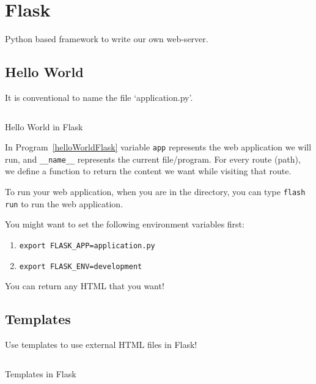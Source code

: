 \chapter{Flask}
Python based framework to write our own web-server.

\section{Hello World}

\begin{remark}
	It is conventional to name the file `application.py'.
\end{remark}

\begin{code}
	\inputminted{python}{codes/web/flask/hello0/application.py}
	\caption{Hello World in Flask}
	\label{helloWorldFlask}
\end{code}

In Program~\ref{helloWorldFlask} variable \texttt{app} represents
the web application we will run, and \texttt{__name__} represents
the current file/program. For every route (path), we define a function to return
the content we want while visiting that route.

To run your web application, when you are in the directory, you can type
\texttt{flash run} to run the web application.

\begin{remark}
	You might want to set the following environment variables first:
	\begin{enumerate}
		\item \texttt{export FLASK_APP=application.py}
		\item \texttt{export FLASK_ENV=development}
	\end{enumerate}
\end{remark}

\begin{remark}
	You can return any HTML that you want!
\end{remark}

\section{Templates}
Use templates to use external HTML files in Flask!

\begin{code}
	\inputminted{python}{codes/web/flask/hello1/application.py}
	\caption{Templates in Flask}
\end{code}

